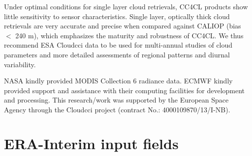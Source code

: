 Under optimal conditions for single layer cloud retrievals, CC4CL products show little sensitivity to sensor characteristics. Single layer, optically thick cloud retrievals are very accurate and precise when compared against CALIOP (bias $<$ 240 m), which emphasizes the maturity and robustness of CC4CL. We thus recommend ESA Cloud\textunderscore cci data to be used for multi-annual studies of cloud parameters and more detailed assessments of regional patterns and diurnal variability.

\begin{acknowledgements}
NASA kindly provided MODIS Collection 6 radiance data. ECMWF kindly provided support and assistance with their computing facilities for development and processing.
This research/work was supported by the European Space Agency through the Cloud\textunderscore cci project (contract No.: 4000109870/13/I-NB).
\end{acknowledgements}

\appendix

\section{ERA-Interim input fields}

